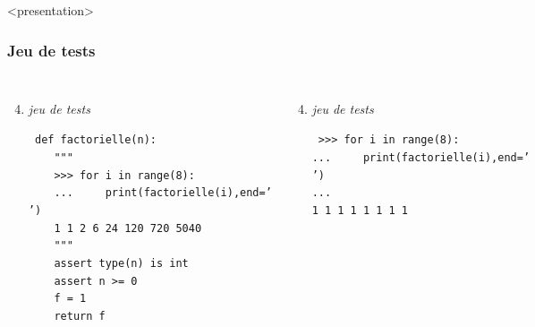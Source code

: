 

\begin{frame}<presentation>
\frametitle{Jeu de tests}
\begin{columns}[T]
\column{5.75cm}
\begin{enumerate}\setcounter{enumi}{3}
\item {\em jeu de tests}
\begin{minipage}[t]{5.5cm}\scriptsize\tt
def factorielle(n):\\
\mbox{}\ \ \ \ \alert{"""}\\
\mbox{}\ \ \ \ \alert{>>> for i in range(8):}\\
\mbox{}\ \ \ \ \alert{...\ \ \ \ \ print(factorielle(i),end=' ')}\\
\mbox{}\ \ \ \ \alert{1 1 2 6 24 120 720 5040}\\
\mbox{}\ \ \ \ \alert{"""}\\
\mbox{}\ \ \ \ assert type(n) is int\\
\mbox{}\ \ \ \ assert n >= 0\\
\mbox{}\ \ \ \ f = 1\\
\mbox{}\ \ \ \ return f
\end{minipage}
\end{enumerate}

\column{5.75cm}
\begin{enumerate}\setcounter{enumi}{3}
\item {\em jeu de tests}
\begin{minipage}[t]{5cm}\scriptsize\tt
>>> for i in range(8):\\
...\ \ \ \ \ print(factorielle(i),end=' ')\\
...\\
1 1 1 1 1 1 1 1
\end{minipage}
\end{enumerate} 

\end{columns}
\pause

\end{frame}
